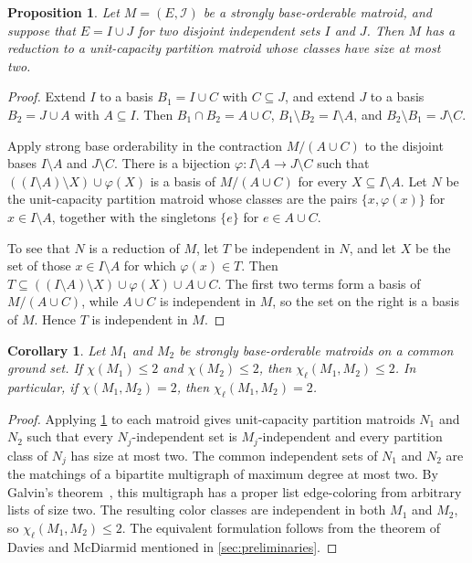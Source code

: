 \documentclass[10pt,a4paper]{article}
\theoremstyle{plain}
\newtheorem{cor}[thm]{Corollary}
\newtheorem{prop}[thm]{Proposition}
\theoremstyle{definition}
\newcommand{\cI}{\mathcal{I}}
\begin{document}
\begin{prop}\label{prop:reduction}
Let $M=(E,\cI)$ be a strongly base-orderable matroid, and suppose that $E=I\cup J$ for two disjoint independent sets $I$ and $J$. Then $M$ has a reduction to a unit-capacity partition matroid whose classes have size at most two.
\end{prop}

\begin{proof}
Extend $I$ to a basis $B_1=I\cup C$ with $C\subseteq J$, and extend $J$ to a basis $B_2=J\cup A$ with $A\subseteq I$. Then $B_1\cap B_2=A\cup C$, $B_1\setminus B_2=I\setminus A$, and $B_2\setminus B_1=J\setminus C$.

Apply strong base orderability in the contraction $M/(A\cup C)$ to the disjoint bases $I\setminus A$ and $J\setminus C$. There is a bijection $\varphi\colon I\setminus A\to J\setminus C$ such that $((I\setminus A)\setminus X)\cup\varphi(X)$ is a basis of $M/(A\cup C)$ for every $X\subseteq I\setminus A$. Let $N$ be the unit-capacity partition matroid whose classes are the pairs $\{x,\varphi(x)\}$ for $x\in I\setminus A$, together with the singletons $\{e\}$ for $e\in A\cup C$.

To see that $N$ is a reduction of $M$, let $T$ be independent in $N$, and let $X$ be the set of those $x\in I\setminus A$ for which $\varphi(x)\in T$. Then $T\subseteq ((I\setminus A)\setminus X)\cup\varphi(X)\cup A\cup C$. The first two terms form a basis of $M/(A\cup C)$, while $A\cup C$ is independent in $M$, so the set on the right is a basis of $M$. Hence $T$ is independent in $M$.
\end{proof}

\begin{cor}\label{cor:sbo}
Let $M_1$ and $M_2$ be strongly base-orderable matroids on a common ground set. If $\chi(M_1)\le2$ and $\chi(M_2)\le2$, then $\chi_\ell(M_1,M_2)\le2$. In particular, if $\chi(M_1,M_2)=2$, then $\chi_\ell(M_1,M_2)=2$.
\end{cor}

\begin{proof}
Applying \cref{prop:reduction} to each matroid gives unit-capacity partition matroids $N_1$ and $N_2$ such that every $N_j$-independent set is $M_j$-independent and every partition class of $N_j$ has size at most two. The common independent sets of $N_1$ and $N_2$ are the matchings of a bipartite multigraph of maximum degree at most two. By Galvin's theorem~\cite{galvin1995list}, this multigraph has a proper list edge-coloring from arbitrary lists of size two. The resulting color classes are independent in both $M_1$ and $M_2$, so $\chi_\ell(M_1,M_2)\le2$. The equivalent formulation follows from the theorem of Davies and McDiarmid mentioned in \cref{sec:preliminaries}.
\end{proof}
\end{document}
